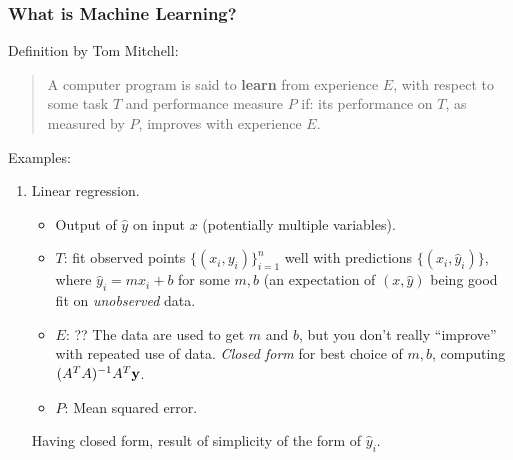 \documentclass{beamer}
\theoremstyle{example}
\begin{document}
\begin{frame}
\frametitle{What is Machine Learning?}
    Definition by Tom Mitchell:\newline 
    \begin{quote}
        A computer program is said to \textbf{learn} from experience $E$, with respect to some task $T$ and performance measure $P$ if: its performance on $T$, as measured by $P$, improves with experience $E$.
    \end{quote}
    
    {\color{mygreen}Examples:}
    \begin{enumerate}
        \item Linear regression.
        \begin{itemize}
            \item Output of $\hat{y}$ on input $x$ (potentially multiple variables).
            \pause
            \item $T$: fit observed points $\{(x_i,y_i)\}_{i=1}^n$ well with predictions $\{(x_i,\hat{y}_i)\}$, where $\hat{y}_i=mx_i+b$ for some $m,b$ (an expectation of $(x,\hat{y})$ being good fit on \textit{unobserved} data. 
            \pause
            \item $E$: ?? \newline 
                    The data are used to get $m$ and $b$, but you don't really ``improve'' with repeated use of data. \newline 
                    \pause
                    \emph{Closed form} for best choice of $m, b$, computing $(A^TA)^{-1}A^T{\bf y}$.
            \pause
            \item $P$: Mean squared error.
        \end{itemize}
        Having closed form, result of simplicity of the form of $\hat{y}_i$.
    \end{enumerate}

\end{frame}
\end{document}
